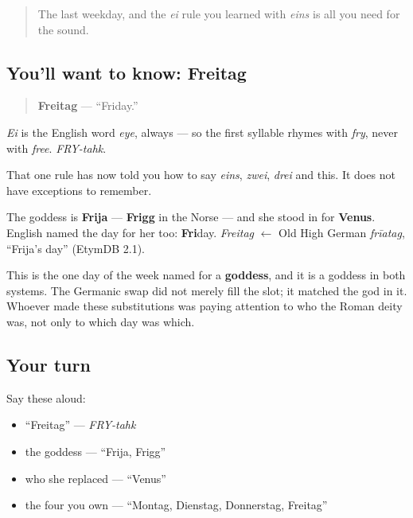\begin{quote}
The last weekday, and the \emph{ei} rule you learned with \emph{eins} is all you need for the sound.
\end{quote}

\subsection*{You'll want to know: Freitag}
\begin{quote}
\textbf{Freitag} — \textquotedblleft{}Friday.\textquotedblright{}
\end{quote}

\emph{Ei} is the English word \emph{eye}, always — so the first syllable rhymes with \emph{fry}, never with \emph{free}. \emph{FRY-tahk}.

That one rule has now told you how to say \emph{eins}, \emph{zwei}, \emph{drei} and this. It does not have exceptions to remember.

\begin{cousinweb}
The goddess is \textbf{Frija} — \textbf{Frigg} in the Norse — and she stood in for \textbf{Venus}. English named the day for her too: \textbf{Fri}day. \emph{Freitag} $\leftarrow$ Old High German \emph{frīatag}, \textquotedblleft{}Frija's day\textquotedblright{} (EtymDB 2.1).

This is the one day of the week named for a \textbf{goddess}, and it is a goddess in both systems. The Germanic swap did not merely fill the slot; it matched the god in it. Whoever made these substitutions was paying attention to who the Roman deity was, not only to which day was which.
\end{cousinweb}

\subsection*{Your turn}
Say these aloud:

\begin{itemize}
\raggedright
  \item \textquotedblleft{}Freitag\textquotedblright{} — \emph{FRY-tahk}
  \item the goddess — \textquotedblleft{}Frija, Frigg\textquotedblright{}
  \item who she replaced — \textquotedblleft{}Venus\textquotedblright{}
  \item the four you own — \textquotedblleft{}Montag, Dienstag, Donnerstag, Freitag\textquotedblright{}
\end{itemize}

